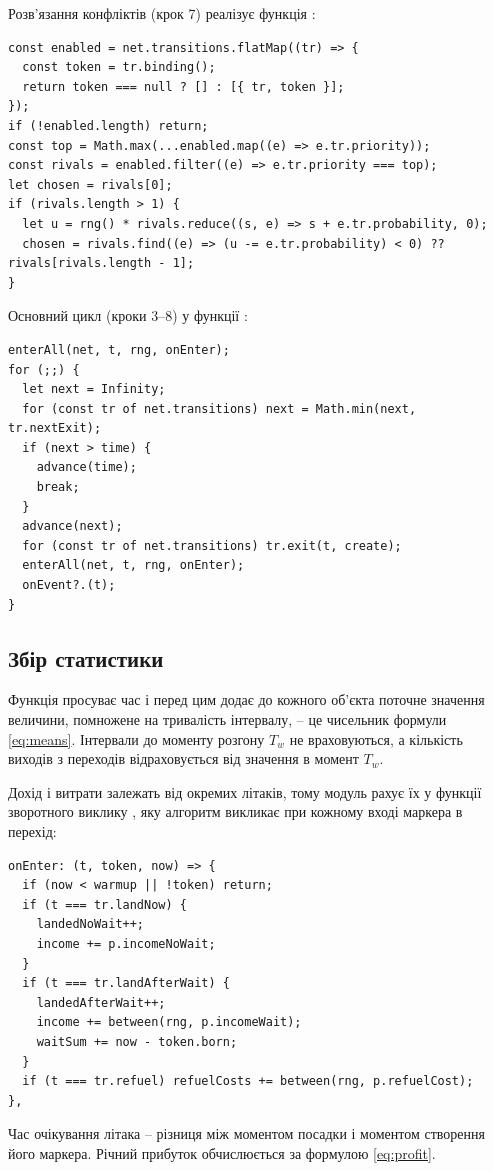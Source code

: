 Розв'язання конфліктів (крок 7) реалізує функція :
\begin{Verbatim}
const enabled = net.transitions.flatMap((tr) => {
  const token = tr.binding();
  return token === null ? [] : [{ tr, token }];
});
if (!enabled.length) return;
const top = Math.max(...enabled.map((e) => e.tr.priority));
const rivals = enabled.filter((e) => e.tr.priority === top);
let chosen = rivals[0];
if (rivals.length > 1) {
  let u = rng() * rivals.reduce((s, e) => s + e.tr.probability, 0);
  chosen = rivals.find((e) => (u -= e.tr.probability) < 0) ?? rivals[rivals.length - 1];
}
\end{Verbatim}

Основний цикл (кроки 3--8) у функції :
\begin{Verbatim}
enterAll(net, t, rng, onEnter);
for (;;) {
  let next = Infinity;
  for (const tr of net.transitions) next = Math.min(next, tr.nextExit);
  if (next > time) {
    advance(time);
    break;
  }
  advance(next);
  for (const tr of net.transitions) tr.exit(t, create);
  enterAll(net, t, rng, onEnter);
  onEvent?.(t);
}
\end{Verbatim}

\subsection{Збір статистики}

Функція  просуває час і перед цим додає до кожного об'єкта  поточне значення величини, помножене на тривалість інтервалу, -- це чисельник формули \eqref{eq:means}. Інтервали до моменту розгону $T_w$ не враховуються, а кількість виходів з переходів відраховується від значення в момент $T_w$.

Дохід і витрати залежать від окремих літаків, тому модуль  рахує їх у функції зворотного виклику , яку алгоритм викликає при кожному вході маркера в перехід:
\begin{Verbatim}
onEnter: (t, token, now) => {
  if (now < warmup || !token) return;
  if (t === tr.landNow) {
    landedNoWait++;
    income += p.incomeNoWait;
  }
  if (t === tr.landAfterWait) {
    landedAfterWait++;
    income += between(rng, p.incomeWait);
    waitSum += now - token.born;
  }
  if (t === tr.refuel) refuelCosts += between(rng, p.refuelCost);
},
\end{Verbatim}
Час очікування літака -- різниця між моментом посадки і моментом створення його маркера. Річний прибуток обчислюється за формулою \eqref{eq:profit}.

